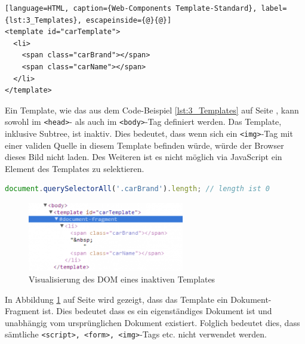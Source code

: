 \begin{lstlisting}[language=HTML, caption={Web-Components Template-Standard}, label={lst:3_Templates}, escapeinside={@}{@}]
<template id="carTemplate">
  <li>
    <span class="carBrand"></span>
    <span class="carName"></span>
  </li>
</template>
\end{lstlisting}

Ein Template, wie das aus dem Code-Beispiel \ref{lst:3_Templates} auf Seite \pageref{lst:3_Templates}, kann sowohl im \lstinline|<head>|- als auch im \lstinline|<body>|-Tag definiert werden. Das Template, inklusive Subtree, ist inaktiv. Dies bedeutet, dass wenn sich ein \lstinline|<img>|-Tag mit einer validen Quelle in diesem Template befinden würde, würde der Browser dieses Bild nicht laden. Des Weiteren ist es nicht möglich via JavaScript ein Element des Templates zu selektieren.
\begin{lstlisting}[language=JavaScript, caption={Beispiel-Selektor eines Elements in einem Template, das nicht aktiven DOM ist}, label={lst:3_Selector_Example}]
  document.querySelectorAll('.carBrand').length; // length ist 0
\end{lstlisting}

\begin{figure}[h]
\centering
\includegraphics[height=3.0cm]{images/document_fragment.png}
\caption[
Visualisierung des DOM eines inaktiven Templates, Urldate: 04.2014
\newline
\small\texttt{\url{http://www.prevent-default.com/wp-content/uploads/2013/04/document-fragment-300x132.png}}
]{Visualisierung des DOM eines inaktiven Templates}
\label{fig:3_inactive_Template_DOM}
\end{figure}

In Abbildung \ref{fig:3_inactive_Template_DOM} auf Seite \pageref{fig:3_inactive_Template_DOM} wird gezeigt, dass das Template ein Dokument-Fragment ist. Dies bedeutet dass es ein eigenständiges Dokument ist und unabhängig vom ursprünglichen Dokument existiert. Folglich bedeutet dies, dass sämtliche \lstinline|<script>, <form>, <img>|-Tags etc. nicht verwendet werden.

